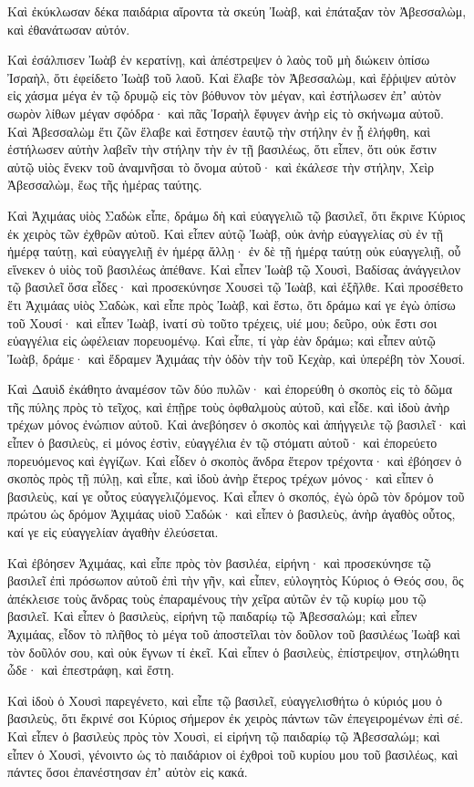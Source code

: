 {Καὶ ἐκύκλωσαν δέκα παιδάρια αἴροντα τὰ σκεύη Ἰωὰβ, καὶ ἐπάταξαν τὸν Ἀβεσσαλὼμ, καὶ ἐθανάτωσαν αὐτόν.
\par }{\PP {}Καὶ ἐσάλπισεν Ἰωὰβ ἐν κερατίνῃ, καὶ ἀπέστρεψεν ὁ λαὸς τοῦ μὴ διώκειν ὀπίσω Ἰσραὴλ, ὅτι ἐφείδετο Ἰωὰβ τοῦ λαοῦ.
Καὶ ἔλαβε τὸν Ἀβεσσαλὼμ, καὶ ἔῤῥιψεν αὐτὸν εἰς χάσμα μέγα ἐν τῷ δρυμῷ εἰς τὸν βόθυνον τὸν μέγαν, καὶ ἐστήλωσεν ἐπʼ αὐτὸν σωρὸν λίθων μέγαν σφόδρα· καὶ πᾶς Ἰσραὴλ ἔφυγεν ἀνὴρ εἰς τὸ σκήνωμα αὐτοῦ.
Καὶ Ἀβεσσαλὼμ ἔτι ζῶν ἔλαβε καὶ ἔστησεν ἑαυτῷ τὴν στήλην ἐν ᾗ ἐλήφθη, καὶ ἐστήλωσεν αὐτὴν λαβεῖν τὴν στήλην τὴν ἐν τῇ βασιλέως, ὅτι εἶπεν, ὅτι οὐκ ἔστιν αὐτῷ υἱὸς ἕνεκν τοῦ ἀναμνῆσαι τὸ ὄνομα αὐτοῦ· καὶ ἐκάλεσε τὴν στήλην, Χεὶρ Ἀβεσσαλὼμ, ἕως τῆς ἡμέρας ταύτης.
\par }{\PP {}Καὶ Ἀχιμάας υἱὸς Σαδὼκ εἶπε, δράμω δὴ καὶ εὐαγγελιῶ τῷ βασιλεῖ, ὅτι ἔκρινε Κύριος ἐκ χειρὸς τῶν ἐχθρῶν αὐτοῦ.
Καὶ εἶπεν αὐτῷ Ἰωὰβ, οὐκ ἀνὴρ εὐαγγελίας σὺ ἐν τῇ ἡμέρᾳ ταύτῃ, καὶ εὐαγγελιῇ ἐν ἡμέρᾳ ἄλλῃ· ἐν δὲ τῇ ἡμέρᾳ ταύτῃ οὐκ εὐαγγελιῇ, οὗ εἵνεκεν ὁ υἱὸς τοῦ βασιλέως ἀπέθανε.
Καὶ εἶπεν Ἰωὰβ τῷ Χουσὶ, Βαδίσας ἀνάγγειλον τῷ βασιλεῖ ὅσα εἶδες· καὶ προσεκύνησε Χουσεὶ τῷ Ἰωὰβ, καὶ ἐξῆλθε.
Καὶ προσέθετο ἕτι Ἀχιμάας υἱὸς Σαδὼκ, καὶ εἶπε πρὸς Ἰωὰβ, καὶ ἔστω, ὅτι δράμω καί γε ἐγὼ ὀπίσω τοῦ Χουσί· καὶ εἶπεν Ἰωὰβ, ἱνατί σὺ τοῦτο τρέχεις, υἱέ μου; δεῦρο, οὐκ ἔστι σοι εὐαγγέλια εἰς ὠφέλειαν πορευομένῳ.
Καὶ εἶπε, τί γὰρ ἐὰν δράμω; καὶ εἶπεν αὐτῷ Ἰωὰβ, δράμε· καὶ ἔδραμεν Ἀχιμάας τὴν ὁδὸν τὴν τοῦ Κεχὰρ, καὶ ὑπερέβη τὸν Χουσί.
\par }{\PP {}Καὶ Δαυὶδ ἐκάθητο ἀναμέσον τῶν δύο πυλῶν· καὶ ἐπορεύθη ὁ σκοπὸς εἰς τὸ δῶμα τῆς πύλης πρὸς τὸ τεῖχος, καὶ ἐπῇρε τοὺς ὀφθαλμοὺς αὐτοῦ, καὶ εἶδε. καὶ ἰδοὺ ἀνὴρ τρέχων μόνος ἐνώπιον αὐτοῦ.
Καὶ ἀνεβόησεν ὁ σκοπὸς καὶ ἀπήγγειλε τῷ βασιλεῖ· καὶ εἶπεν ὁ βασιλεὺς, εἰ μόνος ἐστὶν, εὐαγγέλια ἐν τῷ στόματι αὐτοῦ· καὶ ἐπορεύετο πορευόμενος καὶ ἐγγίζων.
Καὶ εἶδεν ὁ σκοπὸς ἄνδρα ἕτερον τρέχοντα· καὶ ἐβόησεν ὁ σκοπὸς πρὸς τῇ πύλῃ, καὶ εἶπε, καὶ ἰδοὺ ἀνὴρ ἕτερος τρέχων μόνος· καὶ εἶπεν ὁ βασιλεὺς, καί γε οὗτος εὐαγγελιζόμενος.
Καὶ εἶπεν ὁ σκοπός, ἐγὼ ὁρῶ τὸν δρόμον τοῦ πρώτου ὡς δρόμον Ἀχιμάας υἱοῦ Σαδώκ· καὶ εἶπεν ὁ βασιλεὺς, ἀνὴρ ἀγαθὸς οὗτος, καί γε εἰς εὐαγγελίαν ἀγαθὴν ἐλεύσεται.
\par }{\PP {}Καὶ ἐβόησεν Ἀχιμάας, καὶ εἶπε πρὸς τὸν βασιλέα, εἰρήνη· καὶ προσεκύνησε τῷ βασιλεῖ ἐπὶ πρόσωπον αὐτοῦ ἐπὶ τὴν γῆν, καὶ εἶπεν, εὐλογητὸς Κύριος ὁ Θεός σου, ὃς ἀπέκλεισε τοὺς ἄνδρας τοὺς ἐπαραμένους τὴν χεῖρα αὐτῶν ἐν τῷ κυρίῳ μου τῷ βασιλεῖ.
Καὶ εἶπεν ὁ βασιλεὺς, εἰρήνη τῷ παιδαρίῳ τῷ Ἀβεσσαλώμ; καὶ εἶπεν Ἀχιμάας, εἶδον τὸ πλῆθος τὸ μέγα τοῦ ἀποστεῖλαι τὸν δοῦλον τοῦ βασιλέως Ἰωὰβ καὶ τὸν δοῦλόν σου, καὶ οὐκ ἔγνων τί ἐκεῖ.
Καὶ εἶπεν ὁ βασιλεὺς, ἐπίστρεψον, στηλώθητι ὧδε· καὶ ἐπεστράφη, καὶ ἔστη.
\par }{\PP {}Καὶ ἰδοὺ ὁ Χουσὶ παρεγένετο, καὶ εἶπε τῷ βασιλεῖ, εὐαγγελισθήτω ὁ κύριός μου ὁ βασιλεὺς, ὅτι ἔκρινέ σοι Κύριος σήμερον ἐκ χειρὸς πάντων τῶν ἐπεγειρομένων ἐπὶ σέ.
Καὶ εἶπεν ὁ βασιλεὺς πρὸς τὸν Χουσὶ, εἰ εἰρήνη τῷ παιδαρίῳ τῷ Ἀβεσσαλώμ; καὶ εἶπεν ὁ Χουσὶ, γένοιντο ὡς τὸ παιδάριον οἱ ἐχθροὶ τοῦ κυρίου μου τοῦ βασιλέως, καὶ πάντες ὅσοι ἐπανέστησαν ἐπʼ αὐτὸν εἰς κακά.

}
